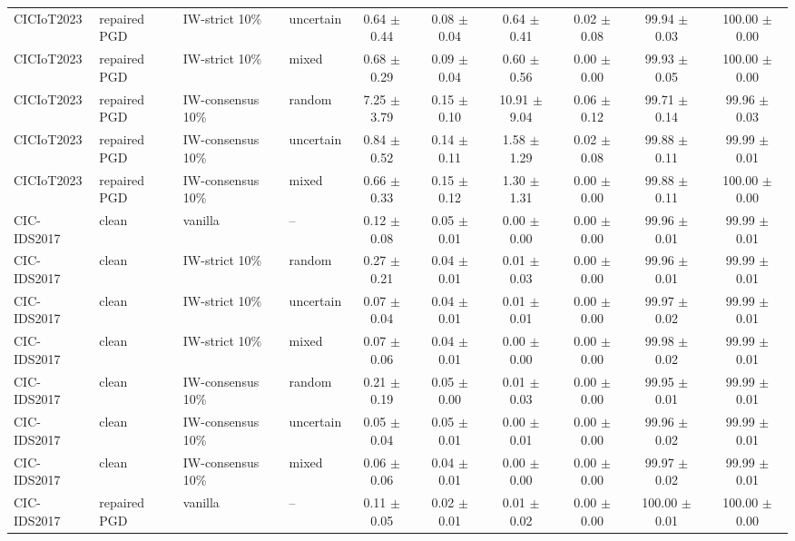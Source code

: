 \begin{table}[t]
\begin{tabular}{llllcccccc}
CICIoT2023 & repaired PGD & IW-strict 10\% & uncertain & 0.64 $\pm$ 0.44 & 0.08 $\pm$ 0.04 & 0.64 $\pm$ 0.41 & 0.02 $\pm$ 0.08 & 99.94 $\pm$ 0.03 & 100.00 $\pm$ 0.00 \\
CICIoT2023 & repaired PGD & IW-strict 10\% & mixed & 0.68 $\pm$ 0.29 & 0.09 $\pm$ 0.04 & 0.60 $\pm$ 0.56 & 0.00 $\pm$ 0.00 & 99.93 $\pm$ 0.05 & 100.00 $\pm$ 0.00 \\
CICIoT2023 & repaired PGD & IW-consensus 10\% & random & 7.25 $\pm$ 3.79 & 0.15 $\pm$ 0.10 & 10.91 $\pm$ 9.04 & 0.06 $\pm$ 0.12 & 99.71 $\pm$ 0.14 & 99.96 $\pm$ 0.03 \\
CICIoT2023 & repaired PGD & IW-consensus 10\% & uncertain & 0.84 $\pm$ 0.52 & 0.14 $\pm$ 0.11 & 1.58 $\pm$ 1.29 & 0.02 $\pm$ 0.08 & 99.88 $\pm$ 0.11 & 99.99 $\pm$ 0.01 \\
CICIoT2023 & repaired PGD & IW-consensus 10\% & mixed & 0.66 $\pm$ 0.33 & 0.15 $\pm$ 0.12 & 1.30 $\pm$ 1.31 & 0.00 $\pm$ 0.00 & 99.88 $\pm$ 0.11 & 100.00 $\pm$ 0.00 \\
CIC-IDS2017 & clean & vanilla & -- & 0.12 $\pm$ 0.08 & 0.05 $\pm$ 0.01 & 0.00 $\pm$ 0.00 & 0.00 $\pm$ 0.00 & 99.96 $\pm$ 0.01 & 99.99 $\pm$ 0.01 \\
CIC-IDS2017 & clean & IW-strict 10\% & random & 0.27 $\pm$ 0.21 & 0.04 $\pm$ 0.01 & 0.01 $\pm$ 0.03 & 0.00 $\pm$ 0.00 & 99.96 $\pm$ 0.01 & 99.99 $\pm$ 0.01 \\
CIC-IDS2017 & clean & IW-strict 10\% & uncertain & 0.07 $\pm$ 0.04 & 0.04 $\pm$ 0.01 & 0.01 $\pm$ 0.01 & 0.00 $\pm$ 0.00 & 99.97 $\pm$ 0.02 & 99.99 $\pm$ 0.01 \\
CIC-IDS2017 & clean & IW-strict 10\% & mixed & 0.07 $\pm$ 0.06 & 0.04 $\pm$ 0.01 & 0.00 $\pm$ 0.00 & 0.00 $\pm$ 0.00 & 99.98 $\pm$ 0.02 & 99.99 $\pm$ 0.01 \\
CIC-IDS2017 & clean & IW-consensus 10\% & random & 0.21 $\pm$ 0.19 & 0.05 $\pm$ 0.00 & 0.01 $\pm$ 0.03 & 0.00 $\pm$ 0.00 & 99.95 $\pm$ 0.01 & 99.99 $\pm$ 0.01 \\
CIC-IDS2017 & clean & IW-consensus 10\% & uncertain & 0.05 $\pm$ 0.04 & 0.05 $\pm$ 0.01 & 0.00 $\pm$ 0.01 & 0.00 $\pm$ 0.00 & 99.96 $\pm$ 0.02 & 99.99 $\pm$ 0.01 \\
CIC-IDS2017 & clean & IW-consensus 10\% & mixed & 0.06 $\pm$ 0.06 & 0.04 $\pm$ 0.01 & 0.00 $\pm$ 0.00 & 0.00 $\pm$ 0.00 & 99.97 $\pm$ 0.02 & 99.99 $\pm$ 0.01 \\
CIC-IDS2017 & repaired PGD & vanilla & -- & 0.11 $\pm$ 0.05 & 0.02 $\pm$ 0.01 & 0.01 $\pm$ 0.02 & 0.00 $\pm$ 0.00 & 100.00 $\pm$ 0.01 & 100.00 $\pm$ 0.00 \\

\end{tabular}
\end{table}
